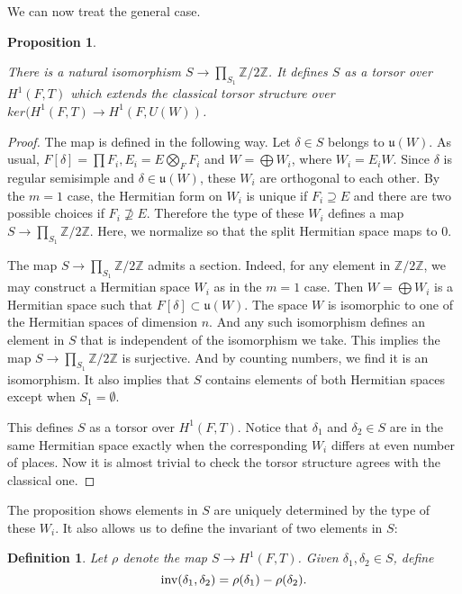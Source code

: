 \documentclass[11pt, oneside,reqno]{amsart}   	%
\newtheorem{definition}[theorem]{Definition}
\newtheorem{proposition}[theorem]{Proposition}
\begin{document}
We can now treat the general case.
 
 \begin{proposition} \label{bijection}
 
 There is a natural isomorphism $S \rightarrow \prod_{S_1}\mathbb{Z}/2\mathbb{Z}$. It defines $S$ as a torsor over $H^1(F,T)$ which extends the classical torsor structure over $ker(H^1(F,T) \rightarrow H^1(F,U(W))$.
 
\end{proposition}
\begin{proof}

The map is defined in the following way. Let $\delta \in S$ belongs to $\mathfrak{u}(W)$. As usual, $F[\delta]=\prod F_i, E_i=E \bigotimes_F F_i$ and $W=\bigoplus W_i$, where $W_i=E_iW$. Since $\delta$ is regular semisimple and $\delta \in \mathfrak{u}(W)$, these $W_i$ are orthogonal to each other. By the $m=1$ case, the Hermitian form on $W_i$ is unique if $F_i \supseteq E$ and there are two possible choices if $F_i \nsupseteq E$. Therefore the type of these $W_i$ defines a map $S \rightarrow \prod_{S_1}\mathbb{Z}/2\mathbb{Z}$. Here, we normalize so that the split Hermitian space maps to 0.

The map $S \rightarrow \prod_{S_1}\mathbb{Z}/2\mathbb{Z}$ admits a section. Indeed, for any element in $\mathbb{Z}/2\mathbb{Z}$, we may construct a Hermitian space $W_i$ as in the $m=1$ case. Then $W=\bigoplus W_i$ is a Hermitian space such that  $F[\delta] \subset \mathfrak{u}(W)$. The space $W$ is isomorphic to one of the Hermitian spaces of dimension $n$. And any such isomorphism defines an element in $S$ that is independent of the isomorphism we take. This implies the map $S \rightarrow \prod_{S_1}\mathbb{Z}/2\mathbb{Z}$ is surjective. And by counting numbers, we find it is an isomorphism. It also implies that $S$ contains elements of both Hermitian spaces except when $S_1=\emptyset$.

This defines $S$ as a torsor over $H^1(F,T)$. Notice that $\delta_1$ and $\delta_2 \in S$ are in the same Hermitian space exactly when the corresponding $W_i$ differs at even number of places. Now it is almost trivial to check the torsor structure agrees with the classical one.
\end{proof}

The proposition shows elements in $S$ are uniquely determined by the type of these $W_i$. It also allows us to define the invariant of two elements in $S$:
\begin{definition}
Let $\rho$ denote the map $S \rightarrow H^1(F,T)$. Given $\delta_1, \delta_2 \in S$, define $$\textup{inv}(\delta_1, \delta_2)=\rho(\delta_1)-\rho(\delta_2).$$

\end{definition}
  
\end{document}
